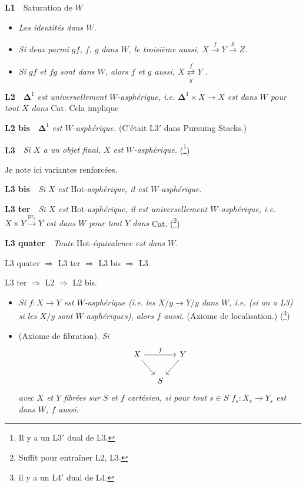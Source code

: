 \documentclass[11pt]{article}
\newcommand{\printedpage}[1]{\marginpar{\footnotesize p.~#1}}
\newcommand{\msp}[1]{\marginpar{\footnotesize [#1]}}
\begin{document}
\noindent\textbf{L1}\ \ Saturation de $W$

\begin{itemize}[leftmargin=2.5em]
\item[a)] \textit{Les identités} \textit{dans $W$.}
\item[b)] \textit{Si deux parmi $gf$, $f$, $g$} \textit{dans $W$, le troisième aussi, $X \xrightarrow{f} Y \xrightarrow{g} Z$.}
\item[c)] \textit{Si $gf$ et $fg$ sont dans $W$, alors $f$ et $g$ aussi, $X \overset{f}{\underset{g}{\rightleftarrows}} Y$ .}
\end{itemize}

\noindent\textbf{L2}\ \ $\mathbf{\Delta}^1$ \textit{est universellement $W$-asphérique, i.e. $\mathbf{\Delta}^1 \times X \longrightarrow X$ est dans $W$ pour tout $X$ dans} Cat. Cela implique

\noindent\textbf{L2 bis}\ \ $\mathbf{\Delta}^1$ \textit{est $W$-asphérique.} (C'était L3$'$ dans Pursuing Stacks.)

\noindent\textbf{L3}\ \ \textit{Si $X$ a un objet final, $X$ est $W$-asphérique.} (\footnote[1]{Il y a un L3$'$ dual de L3.})

\noindent Je note ici variantes renforcées.

\noindent\textbf{L3 bis}\ \ \textit{Si $X$ est} Hot-\textit{asphérique, il est $W$-asphérique.}

\noindent\textbf{L3 ter}\ \ \textit{Si $X$ est} Hot-\textit{asphérique, il est universellement $W$-asphérique, i.e. $X \times Y \xrightarrow{\mathrm{pr}_2} Y$ est dans $W$ pour tout $Y$ dans} Cat. (\footnote[2]{Suffit pour entraîner L2, L3.})

\clearpage

\noindent\printedpage{2}
\textbf{L3 quater}\ \ \textit{Toute} Hot-\textit{équivalence est dans $W$.}

\noindent L3 quater $\Longrightarrow$ L3 ter $\Longrightarrow$ L3 bis $\Longrightarrow$ L3.

\noindent L3 ter $\Longrightarrow$ L2 $\Longrightarrow$ L2 bis.

\noindent\msp{page 2}

\begin{itemize}[leftmargin=2.5em]
\item[\textbf{L4}] \textit{Si $f : X \longrightarrow Y$ est $W$-asphérique (i.e. les $X/y \longrightarrow Y/y$ dans $W$, i.e. (si on a L3) si les $X/y$ sont $W$-asphériques), alors $f$ aussi.} (Axiome de localisation.) (\footnote[3]{il y a un L4$'$ dual de L4.}) 

\item[\textbf{L5}] (Axiome de fibration). \textit{Si}
\[
\begin{tikzcd}[column sep=small]
X \arrow[rr, "f"] \arrow[dr] & & Y \arrow[dl] \\
& S &
\end{tikzcd}
\]
\textit{avec $X$ et $Y$ fibrées sur $S$ et $f$ cartésien, si pour tout $s \in S$ $f_s : X_s \longrightarrow Y_s$ est dans $W$, $f$ aussi.}
\end{itemize}
\end{document}

